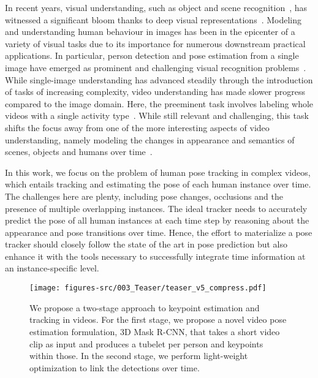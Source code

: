 \documentclass[10pt,twocolumn,letterpaper]{article}
\newcommand{\MODEL}[0]{3D Mask R-CNN}
\begin{document}
In recent years, visual understanding, such as object and scene recognition~\cite{zhou2014learning,he2017mask,ren2015faster,papandreou2017towards}, has witnessed a significant bloom thanks to deep visual representations~\cite{krizhevsky2012imagenet,He15resnet,szegedy2017inception,Simonyan14c}. Modeling and understanding human behaviour in images has been in the epicenter of a variety of visual tasks due to its importance for numerous downstream practical applications. In particular, person detection and pose estimation from a single image have emerged as prominent and challenging visual recognition problems~\cite{lin2014microsoft}. 
While single-image understanding has advanced steadily through the introduction of tasks of increasing complexity, video understanding has made slower progress compared to the image domain. Here, the preeminent task involves labeling whole videos with a single activity type~\cite{ucf101,hmdb51,Karpathy_14,Simonyan_14b,LRCN,tran2015c3d,kay2017kinetics,carreira2017quo,Girdhar_17a_ActionVLAD,TSN2016ECCV,Feichtenhofer16convolutional}. While still relevant and challenging, this task shifts the focus away from one of the more interesting aspects of video understanding, namely modeling the changes in appearance and semantics of scenes, objects and humans over time~\cite{gkioxari15rstar,chao15hico,mallya16actions,Girdhar_17b_AttentionalPoolingAction}.

In this work, we focus on the problem of human pose tracking in complex videos, which entails tracking and estimating the pose of each human instance over time. The challenges here are plenty, including pose changes, occlusions and the presence of multiple overlapping instances. The ideal tracker needs to accurately predict the pose of all human instances at each time step by reasoning about the appearance and pose transitions over time. Hence, the effort to materialize a pose tracker should closely follow the state of the art in pose prediction but also enhance it with the tools necessary to successfully integrate time information at an instance-specific level. 

\begin{figure}
    \centering
    \texttt{[image: figures-src/003\_Teaser/teaser\_v5\_compress.pdf]}
    \caption{We propose a two-stage approach to keypoint estimation and tracking in videos. For the first stage, we propose a novel video pose estimation formulation, \MODEL{}, that takes a short video clip as input and produces a tubelet per person and keypoints within those. In the second stage, we perform light-weight optimization to link the detections over time.}
    \label{fig:teaser}
\end{figure}
\end{document}

